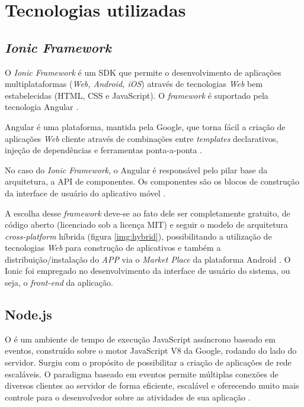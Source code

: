 \section{Tecnologias  utilizadas}

\subsection{\textit{Ionic Framework}} \label{subsec:Ionic}

O \textit{Ionic Framework} é um SDK que permite o desenvolvimento de aplicações multiplataformas (\textit{Web, Android, iOS}) através de tecnologias \textit{Web} bem estabelecidas (HTML, CSS e JavaScript). O \textit{framework} é suportado pela tecnologia Angular \cite{SITEIONIC}.

Angular é uma plataforma, mantida pela Google, que torna fácil a criação de aplicações \textit{Web} cliente através de combinações entre \textit{templates} declarativos, injeção de dependências e ferramentas ponta-a-ponta \cite{SITEANGULAR}.

No caso do \textit{Ionic Framework}, o Angular é responsável pelo pilar base da arquitetura, a API de componentes. Os componentes são os blocos de construção da interface de usuário do aplicativo móvel \cite{SITEIONIC}.

A escolha desse \textit{framework} deve-se ao fato dele ser completamente gratuito, de código aberto (licenciado sob a licença MIT) e seguir o modelo de arquitetura \textit{cross-platform} híbrida (figura \ref{img:hybrid}), possibilitando a utilização de tecnologias \textit{Web} para construção de aplicativos e também a distribuição/instalação do \textit{APP} via o \textit{Market Place} da plataforma Android \cite{SITEIONIC}. O Ionic foi empregado no desenvolvimento da interface de usuário do sistema, ou seja, o \textit{front-end} da aplicação.


\newpage

\subsection{Node.js} \label{subsec:NodeJs}

O  é um ambiente de tempo de execução JavaScript assíncrono baseado em eventos, construído sobre o motor JavaScript V8 da Google, rodando do lado do servidor. Surgiu com o propósito de possibilitar a criação de aplicações de rede escaláveis. O paradigma baseado em eventos permite múltiplas conexões de diversos clientes ao servidor de forma eficiente, escalável e oferecendo muito mais controle para o desenvolvedor sobre as atividades de sua aplicação \cite{tilkov2010node}.
    
